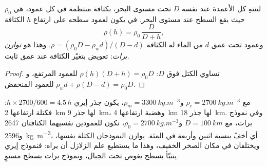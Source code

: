 \begin{proposition}\label{prop:b1:isostasy-gravity:pratt}
لتنتهِ كل الأعمدة عند  نفسه $D$ تحت مستوى البحر، بكثافة منتظمة في كل عمود، هي $\rho_0$ حيث يقع السطح عند مستوى البحر. في  يكون لعمود سطحه على ارتفاع $h$ الكثافة
\[
  \rho(h) = \rho_0\,\frac{D}{D + h},
\]
وعمود تحت عمق $d$ من الماء له الكثافة $\rho = (\rho_0 D - \rho_w d)/(D - d)$. وهذا هو \emph{توازن برات}: تعويض بتغيّر الكثافة عند عمق ثابت.
\end{proposition}

\begin{proof}
تساوي الكتل فوق $D$: $\rho(h)(D + h) = \rho_0 D$ للعمود المرتفع، و$\rho_w d + \rho(D - d) = \rho_0 D$ للعمود المنخفض.
\end{proof}

مع $\rho_c = \qty{2700}{kg.m^{-3}}$ و$\rho_m = \qty{3300}{kg.m^{-3}}$، يكون جذر إيري $h\times2700/600 = 4.5\,h$: فكتلة ارتفاعها \qty{2}{km} لها جذر \qty{9}{km}، وهضبة ارتفاعها \qty{4}{km} لها جذر \qty{18}{km}. وفي نموذج برات، مع $D = \qty{100}{km}$ و$\rho_0 = \qty{2700}{kg.m^{-3}}$، تكون للعمودين نفسيهما الكثافتان 2647 و\qty{2596}{kg.m^{-3}}، أي أخفّ بنسبة اثنين وأربعة في المئة. يوازن النموذجان الكتلة نفسها، ويختلفان في مكان الصخر الخفيف، وهذا ما يستطيع علم الزلازل أن يراه: فنموذج إيري يتنبّأ بسطح  يغوص تحت الجبال، ونموذج برات بسطح  مستوٍ.

